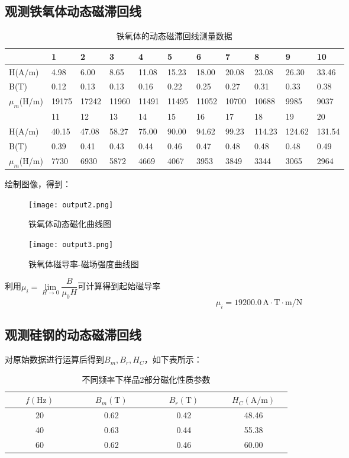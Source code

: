 \documentclass[UTF-8,twoside,cs4size]{ctexart}
\begin{document}
\subsection{观测铁氧体动态磁滞回线}
\begin{table}[!h]
    \centering
    \caption{铁氧体的动态磁滞回线测量数据}
    \begin{tabular}{|l|l|l|l|l|l|l|l|l|l|l|}
    \hline
        ~ & 1 & 2 & 3 & 4 & 5 & 6 & 7 & 8 & 9 & 10\\ \hline
        H(A/m) & 4.98 & 6.00 & 8.65 & 11.08 & 15.23 & 18.00 & 20.08 & 23.08 & 26.30 & 33.46 \\ \hline
        B(T) & 0.12 & 0.13 & 0.13 & 0.16 & 0.22 & 0.25 & 0.27 & 0.31 & 0.33 & 0.38 \\ \hline
        $\mu_m$(H/m) & 19175 & 17242 & 11960 & 11491 & 11495 & 11052 & 10700 & 10688 & 9985 & 9037 \\ \hline
       ~ & 11 & 12 & 13 & 14 & 15 & 16 & 17 & 18 & 19 & 20 \\ \hline
       H(A/m) & 40.15 & 47.08 & 58.27 & 75.00 & 90.00 & 94.62 & 99.23 & 114.23 & 124.62 & 131.54 \\ \hline
       B(T) & 0.39 & 0.41 & 0.43 & 0.44 & 0.46 & 0.47 & 0.48 & 0.48 & 0.48 & 0.49 \\ \hline
       $\mu_m$(H/m) & 7730 & 6930 & 5872 & 4669 & 4067 & 3953 & 3849 & 3344 & 3065 & 2964 \\ \hline
    \end{tabular}
\end{table}
绘制图像，得到：
\begin{figure}[!h]
    \centering
    \texttt{[image: output2.png]}
    \caption{铁氧体动态磁化曲线图}
\end{figure}
\newpage
\begin{figure}[!h]
    \centering
    \texttt{[image: output3.png]}
    \caption{铁氧体磁导率-磁场强度曲线图}
\end{figure}
利用$ \mu_i=\lim\limits_{H\to 0}\dfrac{B}{\mu_0 H} $可计算得到起始磁导率
	\[\mu_i=19200.0\,\mathrm{A\cdot T\cdot m/N}\]
\subsection{观测硅钢的动态磁滞回线}
对原始数据进行运算后得到$ B_m,B_r,H_C $，如下表所示：
\begin{table}[!h]
    \centering
    \begin{tabular}{|c|c|c|c|}
        \hline
        $ \qquad f(\mathrm{Hz})\qquad $ & $ \qquad B_m(\mathrm T)\qquad $ & $ \qquad B_r(\mathrm T)\qquad $ & $ \quad H_C(\mathrm{A/m})\quad $\\
        \hline
        20 & 0.62 & 0.42 & 48.46\\
        \hline
        40 & 0.63 & 0.44 & 55.38 \\
        \hline
        60 & 0.62 & 0.46 & 60.00 \\
        \hline
    \end{tabular}
    \caption{\small 不同频率下样品2部分磁化性质参数}
\end{table}
\end{document}
